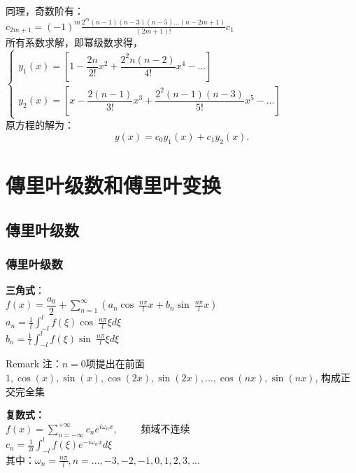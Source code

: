 \begin{frame}	
	同理，奇数阶有：\\
	{ $\displaystyle
		c_{2m+1} = (-1) ^m \frac{2^m (n-1) (n-3)(n-5)...(n-2m+1)  } {(2m+1)!} c_1$}\\ \vspace{0.3cm}
	所有系数求解，即幂级数求得，\\
	$\displaystyle \begin{cases}
		y_1(x)  = [1- \dfrac{2n}{2!} x^2+ \dfrac{2^2n(n-2)}{4!} x^4 -...  ] \\
		y_2(x)  = [x- \dfrac{2(n-1)}{3!} x^3+ \dfrac{2^2(n-1)(n-3) }{5!}x^5 -...  ]
	\end{cases}$ \\ \vspace{0.3cm}
	原方程的解为：
	\begin{equation*}
		y(x) =c_0y_1(x)+c_1 y_2(x).
	\end{equation*}   
\end{frame}

\section{傳里叶级数和傅里叶变换}
\subsection{傳里叶级数 }

\begin{frame}
\frametitle{傳里叶级数}
	\textbf{\large 三角式}：\\
	{\large  $\displaystyle f(x) =\dfrac{a_0}{2} +\sum_{n=1}^{\infty}  \left(  a_n \cos~ \frac{n\pi}{l} x +  b_n \sin~ \frac{n\pi}{l} x  \right) $ }\\	
	{\large $\displaystyle a_n =\frac{1}{l}  \int_{-l}^{l}  f(\xi )   \cos~ \frac{n\pi}{l} \xi d\xi  $ }\\	
	{\large $\displaystyle b_n =\frac{1}{l}  \int_{-l}^{l}  f(\xi )   \sin~ \frac{n\pi}{l} \xi d\xi   $ }\\	
	
	\begin{block} {Remark}
	注：$n=0$项提出在前面 \\
	$1, \cos(x), \sin (x), \cos(2x), \sin (2x), ..., \cos(nx), \sin (nx) $, 构成正交完全集
	\end{block}
\end{frame}

\begin{frame}
	\textbf{ \large 复数式：} \\  
	{\large  $\displaystyle f(x) =\sum_{n=-\infty}^{+\infty}  c_n e^{i\omega_n x}, \qquad $  频域不连续 }\\	
	{\large $\displaystyle c_n =\frac{1}{2l}  \int_{-l}^{l}  f(\xi)    e^{-i\omega_n x}  d\xi  $ }\\	
	其中：{\large $\displaystyle   \omega_n=\frac{n\pi}{l} ,  n=...,-3,-2,-1,0,1,2,3,...   $} \\
\end{frame}


